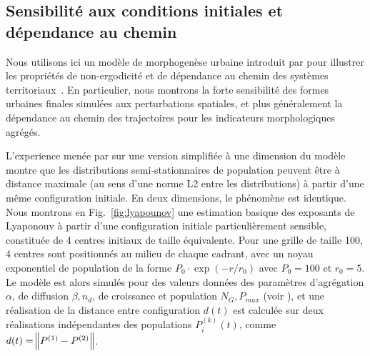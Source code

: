 \documentclass[11pt]{article}
\begin{document}
\subsection{Sensibilité aux conditions initiales et dépendance au chemin}

Nous utilisons ici un modèle de morphogenèse urbaine introduit par \cite{raimbault2018calibration} pour illustrer les propriétés de non-ergodicité et de dépendance au chemin des systèmes territoriaux~\citep{pumain2012urban}. En particulier, nous montrons la forte sensibilité des formes urbaines finales simulées aux perturbations spatiales, et plus généralement la dépendance au chemin des trajectoires pour les indicateurs morphologiques agrégés.

L'experience menée par \cite{raimbault2018calibration} sur une version simplifiée à une dimension du modèle montre que les distributions semi-stationnaires de population peuvent être à distance maximale (au sens d'une norme L2 entre les distributions) à partir d'une même configuration initiale. En deux dimensions, le phénomène est identique. Nous montrons en Fig.~\ref{fig:lyapounov} une estimation basique des exposants de Lyaponouv à partir d'une configuration initiale particulièrement sensible, constituée de 4 centres initiaux de taille équivalente. Pour une grille de taille 100, 4 centres sont positionnés au milieu de chaque cadrant, avec un noyau exponentiel de population de la forme $P_0 \cdot \exp \left(-r/r_0\right)$ avec $P_0 = 100$ et $r_0 = 5$. Le modèle est alors simulés pour des valeurs données des paramètres d'agrégation $\alpha$, de diffusion $\beta, n_d$, de croissance et population $N_G, P_{max}$ (voir \cite{raimbault2018calibration}), et une réalisation de la distance entre configuration $d(t)$ est calculée sur deux réalisations indépendantes des populations $P^{(k)}_i(t)$, comme $d(t)=\norm{P^{(1)} - P^{(2)}}$. 
\end{document}

